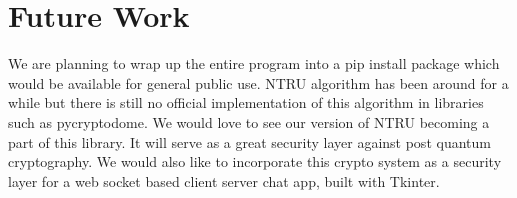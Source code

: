 \documentclass[a4paper,12pt]{article}
\begin{document}
\section{Future Work}
\begin{flushleft}
We are planning to wrap up the entire program into a pip install package which would be available for general public use. NTRU algorithm has been around for a while but there is still no official implementation of this algorithm in libraries such as pycryptodome. We would love to see our version of NTRU becoming a part of this library. It will serve as a great security layer against post quantum cryptography. We would also like to incorporate this crypto system as a security layer for a web socket based client server chat app, built with Tkinter.
\end{flushleft}
\newpage


\end{document}
